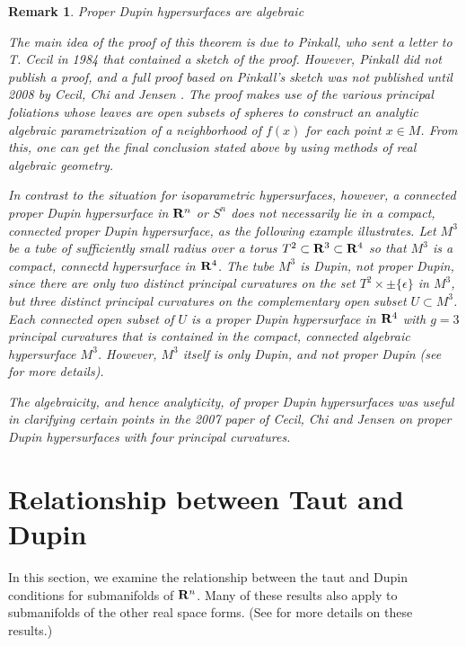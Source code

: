 \documentclass[12pt]{article}
\newtheorem{remark}{Remark}[section]
\begin{document}
{\begin{remark}{Proper Dupin hypersurfaces are algebraic}
{\rm The main idea of the proof of this theorem is due to
Pinkall, who sent a letter \cite{P6} to T. Cecil in 1984 that contained a sketch of the proof.  
However, Pinkall did not publish 
a proof, and a full proof based on Pinkall's sketch 
was not published until 2008 by Cecil, Chi and Jensen \cite{CCJ3}.
The proof makes use of the various principal foliations whose leaves are open subsets of spheres to construct an analytic algebraic parametrization of a 
neighborhood of $f(x)$ for each point $x \in M$. From this, one can get the final conclusion stated above
by using methods of real algebraic geometry.



In contrast to the situation for isoparametric hypersurfaces, however, a connected proper Dupin hypersurface 
in ${\bf R}^n$ or $S^n$ does not necessarily lie in a compact, connected proper Dupin hypersurface, 
as the following example illustrates.
Let $M^3$ be a tube of sufficiently small radius over a torus
$T^2 \subset {\bf R}^3 \subset {\bf R}^4$ so that $M^3$ is a compact, connectd hypersurface in ${\bf R}^4$.
The tube $M^3$ is Dupin, not proper Dupin, 
since there are only two distinct principal
curvatures on the set $T^2 \times \pm \{\epsilon\}$ in $M^3$, but three distinct
principal curvatures on the complementary open subset $U \subset M^3$.   
Each connected open subset of  $U$ is a proper Dupin hypersurface in ${\bf R}^4$
with $g=3$ principal curvatures that is contained in the compact, connected algebraic hypersurface $M^3$. 
However, $M^3$ itself is only Dupin, and not proper Dupin (see \cite[p. 69]{Cec9} for more details).




The algebraicity,
and hence analyticity, of proper Dupin hypersurfaces was useful in clarifying certain points in the
2007 paper \cite{CCJ2} of Cecil, Chi and Jensen on proper Dupin hypersurfaces with four principal curvatures.}
\end{remark}

\section{Relationship between Taut and Dupin}
\label{sec:relationship-taut-dupin}

In this section, we examine the relationship between the taut
and Dupin conditions for submanifolds of ${\bf R}^n$.  Many of these results also apply to submanifolds of the
other real space forms.
(See \cite[pp. 65--74]{CR8} for more details on these results.)

}
\end{document}
